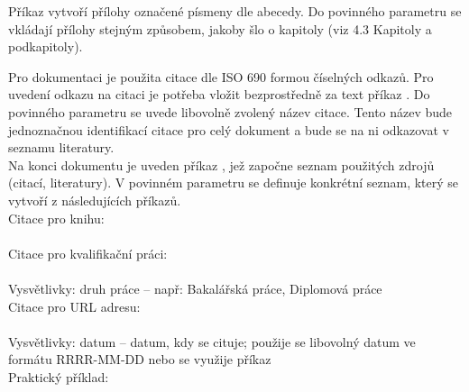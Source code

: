 \documentclass[a4paper, 12pt]{report}
\begin{document}
	Příkaz  vytvoří přílohy označené písmeny dle abecedy. Do povinného parametru se vkládají přílohy stejným způsobem, jakoby šlo o kapitoly (viz 4.3 Kapitoly a podkapitoly).\\
	
	Pro dokumentaci je použita citace dle ISO 690 formou číselných odkazů. Pro uvedení odkazu na citaci je potřeba vložit bezprostředně za text příkaz . Do povinného parametru se uvede libovolně zvolený název citace. Tento název bude jednoznačnou identifikací citace pro celý dokument a bude se na ni odkazovat v seznamu literatury.\\
	Na konci dokumentu je uveden příkaz , jež započne seznam použitých zdrojů (citací, literatury). V povinném parametru se definuje konkrétní seznam, který se vytvoří z následujících příkazů.\\[1cm]
	Citace pro knihu:\\
	\\[1cm]
	Citace pro kvalifikační práci:\\
	\\
	Vysvětlivky: druh práce – např: Bakalářská práce, Diplomová práce
	\\[1cm]
	Citace pro URL adresu:\\
	\\
	Vysvětlivky: datum -- datum, kdy se cituje; použije se libovolný datum ve formátu RRRR-MM-DD nebo se využije příkaz 
	\\[1cm]
	Praktický příklad:\\
\end{document}
